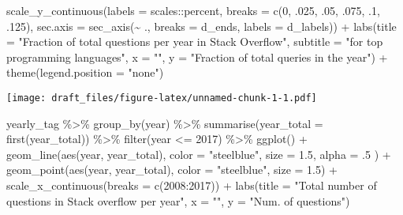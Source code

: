 \documentclass[
]{article}
\newenvironment{Shaded}{\begin{snugshade}}{\end{snugshade}}
\newcommand{\AttributeTok}[1]{\textcolor[rgb]{0.77,0.63,0.00}{#1}}
\newcommand{\DecValTok}[1]{\textcolor[rgb]{0.00,0.00,0.81}{#1}}
\newcommand{\FloatTok}[1]{\textcolor[rgb]{0.00,0.00,0.81}{#1}}
\newcommand{\FunctionTok}[1]{\textcolor[rgb]{0.00,0.00,0.00}{#1}}
\newcommand{\NormalTok}[1]{#1}
\newcommand{\SpecialCharTok}[1]{\textcolor[rgb]{0.00,0.00,0.00}{#1}}
\newcommand{\StringTok}[1]{\textcolor[rgb]{0.31,0.60,0.02}{#1}}
\begin{document}
\begin{Shaded}
\begin{Highlighting}[]
  \FunctionTok{scale\_y\_continuous}\NormalTok{(}\AttributeTok{labels =}\NormalTok{ scales}\SpecialCharTok{::}\NormalTok{percent, }\AttributeTok{breaks =} \FunctionTok{c}\NormalTok{(}\DecValTok{0}\NormalTok{, .}\DecValTok{025}\NormalTok{, .}\DecValTok{05}\NormalTok{, .}\DecValTok{075}\NormalTok{, .}\DecValTok{1}\NormalTok{, .}\DecValTok{125}\NormalTok{), }\AttributeTok{sec.axis =} \FunctionTok{sec\_axis}\NormalTok{(}\SpecialCharTok{\textasciitilde{}}\NormalTok{ ., }\AttributeTok{breaks =}\NormalTok{ d\_ends, }\AttributeTok{labels =}\NormalTok{ d\_labels)) }\SpecialCharTok{+}
  \FunctionTok{labs}\NormalTok{(}\AttributeTok{title =} \StringTok{"Fraction of total questions per year in Stack Overflow"}\NormalTok{,}
       \AttributeTok{subtitle =} \StringTok{"for top programming languages"}\NormalTok{,}
       \AttributeTok{x =} \StringTok{""}\NormalTok{, }
       \AttributeTok{y =} \StringTok{"Fraction of total queries in the year"}\NormalTok{) }\SpecialCharTok{+}
  \FunctionTok{theme}\NormalTok{(}\AttributeTok{legend.position =} \StringTok{"none"}\NormalTok{)}
\end{Highlighting}
\end{Shaded}

\texttt{[image: draft\_files/figure-latex/unnamed-chunk-1-1.pdf]}

\begin{Shaded}
\begin{Highlighting}[]
\NormalTok{yearly\_tag }\SpecialCharTok{\%\textgreater{}\%} 
  \FunctionTok{group\_by}\NormalTok{(year) }\SpecialCharTok{\%\textgreater{}\%} 
  \FunctionTok{summarise}\NormalTok{(}\AttributeTok{year\_total =} \FunctionTok{first}\NormalTok{(year\_total)) }\SpecialCharTok{\%\textgreater{}\%}
  \FunctionTok{filter}\NormalTok{(year }\SpecialCharTok{\textless{}=} \DecValTok{2017}\NormalTok{) }\SpecialCharTok{\%\textgreater{}\%} 
  \FunctionTok{ggplot}\NormalTok{() }\SpecialCharTok{+}
  \FunctionTok{geom\_line}\NormalTok{(}\FunctionTok{aes}\NormalTok{(year, year\_total), }\AttributeTok{color =} \StringTok{"steelblue"}\NormalTok{, }\AttributeTok{size =} \FloatTok{1.5}\NormalTok{, }\AttributeTok{alpha =}\NormalTok{ .}\DecValTok{5}\NormalTok{ ) }\SpecialCharTok{+}
  \FunctionTok{geom\_point}\NormalTok{(}\FunctionTok{aes}\NormalTok{(year, year\_total), }\AttributeTok{color =} \StringTok{"steelblue"}\NormalTok{, }\AttributeTok{size =} \FloatTok{1.5}\NormalTok{) }\SpecialCharTok{+}
  \FunctionTok{scale\_x\_continuous}\NormalTok{(}\AttributeTok{breaks =} \FunctionTok{c}\NormalTok{(}\DecValTok{2008}\SpecialCharTok{:}\DecValTok{2017}\NormalTok{)) }\SpecialCharTok{+}
  \FunctionTok{labs}\NormalTok{(}\AttributeTok{title =} \StringTok{"Total number of questions in Stack overflow per year"}\NormalTok{,}
       \AttributeTok{x =} \StringTok{""}\NormalTok{,}
       \AttributeTok{y =} \StringTok{"Num. of questions"}\NormalTok{)}
\end{Highlighting}
\end{Shaded}
\end{document}

